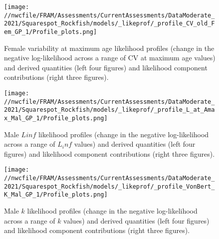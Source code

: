 \documentclass[11pt,
  english,
  a4paper,
]{article}
\begin{document}
\tagmcend\tagstructend


\begin{figure}
\centering
\texttt{[image: //nwcfile/FRAM/Assessments/CurrentAssessments/DataModerate\_2021/Squarespot\_Rockfish/models/\_likeprof/\_profile\_CV\_old\_Fem\_GP\_1/Profile\_plots.png]}
\caption{Female variability at maximum age likelihood profiles (change in the negative log-likelihood across a range of CV at maximum age values) and derived quantities (left four figures) and likelihood component contributions (right three figures).\label{fig:CVold_f-profile-combo}}
\end{figure}

\tagmcend\tagstructend


\begin{figure}
\centering
\texttt{[image: //nwcfile/FRAM/Assessments/CurrentAssessments/DataModerate\_2021/Squarespot\_Rockfish/models/\_likeprof/\_profile\_L\_at\_Amax\_Mal\_GP\_1/Profile\_plots.png]}
\caption{Male {\(Linf\)\leavevmode\tagmcend\tagstructend} likelihood profiles (change in the negative log-likelihood across a range of {\(L_inf\)\leavevmode\tagmcend\tagstructend} values) and derived quantities (left four figures) and likelihood component contributions (right three figures).\label{fig:Linf_M-profile-combo}}
\end{figure}

\tagmcend\tagstructend


\begin{figure}
\centering
\texttt{[image: //nwcfile/FRAM/Assessments/CurrentAssessments/DataModerate\_2021/Squarespot\_Rockfish/models/\_likeprof/\_profile\_VonBert\_K\_Mal\_GP\_1/Profile\_plots.png]}
\caption{Male {\(k\)\leavevmode\tagmcend\tagstructend} likelihood profiles (change in the negative log-likelihood across a range of {\(k\)\leavevmode\tagmcend\tagstructend} values) and derived quantities (left four figures) and likelihood component contributions (right three figures).\label{fig:k_m-profile-combo}}
\end{figure}
\end{document}
